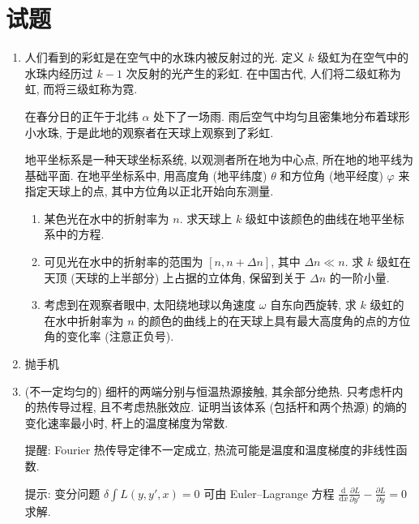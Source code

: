 \documentclass{article}
\begin{document}
\section*{试题}

\begin{enumerate}

\item
人们看到的彩虹是在空气中的水珠内被反射过的光.
定义 $k$ 级虹为在空气中的水珠内经历过 $k-1$ 次反射的光产生的彩虹.
在中国古代, 人们将二级虹称为虹, 而将三级虹称为霓.

在春分日的正午于北纬 $\alpha$ 处下了一场雨.
雨后空气中均匀且密集地分布着球形小水珠, 于是此地的观察者在天球上观察到了彩虹.

地平坐标系是一种天球坐标系统, 以观测者所在地为中心点, 所在地的地平线为基础平面.
在地平坐标系中, 用高度角 (地平纬度) $\theta$ 和方位角 (地平经度) $\varphi$ 来指定天球上的点,
其中方位角以正北开始向东测量.

\begin{enumerate}

	\item
	某色光在水中的折射率为 $n$.
	求天球上 $k$ 级虹中该颜色的曲线在地平坐标系中的方程.

	\item
	可见光在水中的折射率的范围为 $\left[n,n+\Delta n\right]$, 其中 $\Delta n\ll n$.
	求 $k$ 级虹在天顶 (天球的上半部分) 上占据的立体角, 保留到关于 $\Delta n$ 的一阶小量.

	\item
	考虑到在观察者眼中, 太阳绕地球以角速度 $\omega$ 自东向西旋转,
	求 $k$ 级虹的在水中折射率为 $n$ 的颜色的曲线上的在天球上具有最大高度角的点的方位角的变化率 (注意正负号).
\end{enumerate}

\item
抛手机

\item
(不一定均匀的) 细杆的两端分别与恒温热源接触, 其余部分绝热.
只考虑杆内的热传导过程, 且不考虑热胀效应.
证明当该体系 (包括杆和两个热源) 的熵的变化速率最小时, 杆上的温度梯度为常数.

提醒: Fourier 热传导定律不一定成立,
热流可能是温度和温度梯度的非线性函数.

提示: 变分问题 $\delta\int L\left(y,y',x\right)=0$
可由 Euler--Lagrange 方程 $\frac{\mathrm d}{\mathrm dx}\frac{\partial L}{\partial y'}-\frac{\partial L}{\partial y}=0$ 求解.

\end{enumerate}

\newpage
\end{document}
